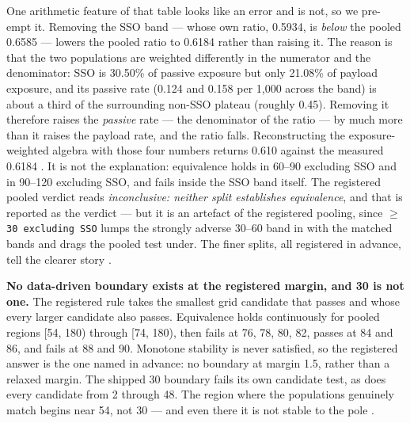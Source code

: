 \documentclass[11pt]{article}
\begin{document}
One arithmetic feature of that table looks like an error and is not, so we pre-empt it. Removing the SSO band --- whose own ratio, 0.5934, is \emph{below} the pooled 0.6585 --- lowers the pooled ratio to 0.6184 rather than raising it. The reason is that the two populations are weighted differently in the numerator and the denominator: SSO is 30.50\% of passive exposure but only 21.08\% of payload exposure, and its passive rate (0.124 and 0.158 per 1,000 across the band) is about a third of the surrounding non-SSO plateau (roughly 0.45). Removing it therefore raises the \emph{passive} rate --- the denominator of the ratio --- by much more than it raises the payload rate, and the ratio falls. Reconstructing the exposure-weighted algebra with those four numbers returns 0.610 against the measured 0.6184%
. It is not the explanation: equivalence holds in 60--90\textdegree{} excluding SSO and in 90--120\textdegree{} excluding SSO, and fails inside the SSO band itself. The registered pooled verdict reads \emph{inconclusive: neither split establishes equivalence}, and that is reported as the verdict --- but it is an artefact of the registered pooling, since \texttt{$\ge$30\textdegree{} excluding SSO} lumps the strongly adverse 30--60\textdegree{} band in with the matched bands and drags the pooled test under. The finer splits, all registered in advance, tell the clearer story%
.

\textbf{No data-driven boundary exists at the registered margin, and 30\textdegree{} is not one.} The registered rule takes the smallest grid candidate that passes and whose every larger candidate also passes. Equivalence holds continuously for pooled regions [54\textdegree{}, 180\textdegree{}) through [74\textdegree{}, 180\textdegree{}), then fails at 76, 78, 80, 82, passes at 84 and 86, and fails at 88 and 90. Monotone stability is never satisfied, so the registered answer is the one named in advance: no boundary at margin 1.5, rather than a relaxed margin. The shipped 30\textdegree{} boundary fails its own candidate test, as does every candidate from 2 through 48. The region where the populations genuinely match begins near 54\textdegree{}, not 30\textdegree{} --- and even there it is not stable to the pole%
.
\end{document}
